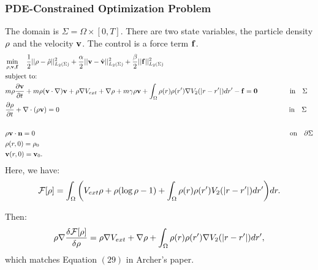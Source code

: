 
\subsubsection*{PDE-Constrained Optimization Problem}
The domain is $\Sigma=\Omega \times [0,T]$. There are two state variables, the particle density $\rho$ and the velocity $\mathbf{v}$. The control is a force term $\mathbf{f}$. 
\begin{align*}
&\min_{\Sta,\Stav,\Con } \quad \frac{1}{2}||\Sta - \hat \Sta||_{L_2(\Sigma)}^2 + \frac{\alpha}{2}||\Stav - \hat \Stav||_{L_2(\Sigma)}^2 +\frac{\beta}{2}||\Con||_{L_2(\Sigma)}^2\\
&\text{subject to:}\\
&m \Sta \frac{\partial \Stav}{\partial t} + m \Sta (\Stav \cdot \nabla)\Stav + \Sta \nabla V_{ext} + \nabla \Sta + m\gamma \Sta \Stav +\int_\Omega \rho(r) \rho(r') \nabla V_2(|r-r'|)dr'  -\Con=\mathbf{0} \ \ \ \qquad \ \ \quad\text{in} \quad \Sigma\\
&\frac{\partial \Sta}{\partial t} + \nabla \cdot (\Sta \Stav)=0 \qquad\qquad \qquad\qquad\qquad\quad \quad\quad\qquad \qquad\qquad \qquad\qquad\qquad\quad \qquad\qquad\qquad\quad\ \text{in} \quad \Sigma\\
\\
&\Sta \Stav \cdot \mathbf{n} =0\qquad\qquad \qquad\qquad\qquad\qquad\qquad\qquad\qquad \qquad\qquad \qquad\qquad\qquad \qquad\qquad\qquad\quad \qquad \text{on} \quad \partial  \Sigma\\
& \Sta(r,0)=\Sta_0\\
& \Stav(r,0)=\Stav_0.
\end{align*}
Here, we have:
\begin{align*}
\mathcal{F}[\rho]=\int_\Omega  \bigg( V_{ext}\rho + \rho (\log \rho -1) +  \int_\Omega \rho(r) \rho(r')V_2(|r-r'|)dr' \bigg) dr.
\end{align*}

Then:
\begin{align*}
\rho \nabla \frac{\delta \mathcal{F}[\rho]}{\delta \rho} = \rho \nabla V_{ext} + \nabla \rho + \int_\Omega \rho(r) \rho(r') \nabla V_2(|r-r'|)dr',
\end{align*}
which matches Equation $(29)$ in Archer's paper.
